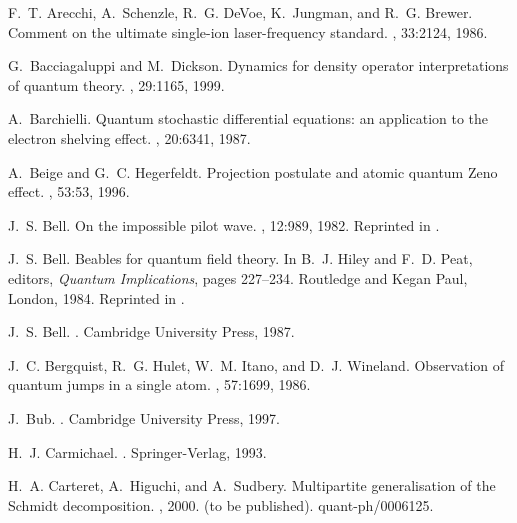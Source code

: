 \documentclass[12pt,a4paper,reqno]{article}
\renewcommand{\(}{\left(}
\renewcommand{\)}{\right)}
\newcommand{\<}{\langle}
\renewcommand{\>}{\rangle}
\theoremstyle{plain} %
\theoremstyle{definition}
\theoremstyle{remark}
\begin{document}
%
%

\newpage
{}

\begin{thebibliography}{10}

F.~T. Arecchi, A.~Schenzle, R.~G. DeVoe, K.~Jungman, and R.~G. Brewer.
\newblock Comment on the ultimate single-ion laser-frequency standard.
, 33:2124, 1986.

G.~Bacciagaluppi and M.~Dickson.
\newblock Dynamics for density operator interpretations of quantum theory.
, 29:1165, 1999.

A.~Barchielli.
\newblock Quantum stochastic differential equations: an application to the
  electron shelving effect.
, 20:6341, 1987.

A.~Beige and G.~C. Hegerfeldt.
\newblock Projection postulate and atomic quantum {Z}eno effect.
, 53:53, 1996.

J.~S. Bell.
\newblock On the impossible pilot wave.
, 12:989, 1982.
\newblock Reprinted in \cite{Bell:book}.

J.~S. Bell.
\newblock Beables for quantum field theory.
\newblock In B.~J. Hiley and F.~D. Peat, editors, {\em Quantum Implications},
  pages 227--234. Routledge and Kegan Paul, London, 1984.
\newblock Reprinted in \cite{Bell:book}.

J.~S. Bell.
.
\newblock Cambridge University Press, 1987.

J.~C. Bergquist, R.~G. Hulet, W.~M. Itano, and D.~J. Wineland.
\newblock Observation of quantum jumps in a single atom.
, 57:1699, 1986.

J.~Bub.
.
\newblock Cambridge University Press, 1997.

H.~J. Carmichael.
.
\newblock Springer-Verlag, 1993.

H.~A. Carteret, A.~Higuchi, and A.~Sudbery.
\newblock Multipartite generalisation of the {S}chmidt decomposition.
, 2000.
\newblock (to be published). quant-ph/0006125.


\end{thebibliography}
\end{document}
